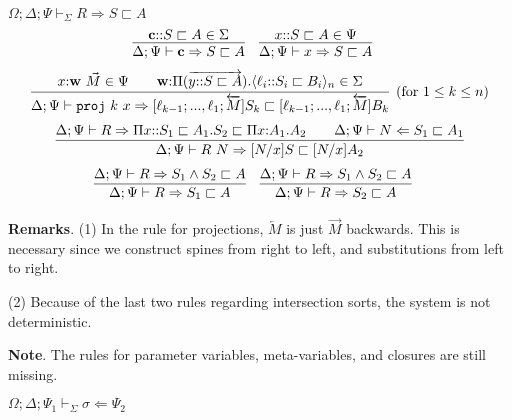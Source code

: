 \documentclass[letterpaper, 11pt]{article}
\newcommand{\Rar}{\Rightarrow}
\newcommand{\Lar}{\Leftarrow}
\newcommand{\proj}{\texttt{proj}}
\begin{document}
    $\boxed{\Omega; \Delta; \Psi \vdash_\Sigma R \Rar S \sqsubset A}$
    \begin{align*}
      & \infer{\Delta; \Psi \vdash \textbf{c} \Rar S \sqsubset A}
        {
          \textbf{c} {::} S \sqsubset A \in \Sigma
        } &
      & \infer{\Delta; \Psi \vdash x \Rar S \sqsubset A}
        {
          x {::} S \sqsubset A \in \Psi
        } 
    \end{align*}
    \begin{align*}
      \infer[(\text{for } 1 \leq k \leq n)]
            {\Delta; \Psi \vdash \proj \ k \ x \Rar [\ell_{k-1}; ..., \ell_1; \overleftarrow{M}]S_k \sqsubset [\ell_{k-1}; ..., \ell_1; \overleftarrow{M}] B_k}
            {
              x {:} \textbf{w} \ \vec{M} \in \Psi
              &&
              \textbf{w} {:} \Pi (\overrightarrow{y {::} S \sqsubset A}). \langle \ell_i {::} S_i \sqsubset B_i \rangle_n \in \Sigma
            }
    \end{align*}
    \begin{align*}
      \infer{\Delta; \Psi \vdash R \ N \Rar [N/x]S \sqsubset [N/x]A_2}
            {
              \Delta; \Psi \vdash R \Rar \Pi x{::}S_1 \sqsubset A_1. S_2 \sqsubset \Pi x{:}A_1. A_2
              &&
              \Delta; \Psi \vdash N \Lar S_1 \sqsubset A_1
            }
    \end{align*}
    \begin{align*}
      & \infer{\Delta; \Psi \vdash R \Rar S_1 \sqsubset A}
              {\Delta; \Psi \vdash R \Rar S_1 \land S_2 \sqsubset A} &
      & \infer{\Delta; \Psi \vdash R \Rar S_2 \sqsubset A}
              {\Delta; \Psi \vdash R \Rar S_1 \land S_2 \sqsubset A}
    \end{align*}
    
    \textbf{Remarks}. (1) In the rule for projections, $\overleftarrow{M}$ is just $\vec{M}$ backwards.  This is necessary since we construct spines
    from right to left, and substitutions from left to right.

    (2) Because of the last two rules regarding intersection sorts, the system is not deterministic.

    \textbf{Note}.  The rules for parameter variables, meta-variables, and closures are still missing.  

    $\boxed{\Omega; \Delta; \Psi_1 \vdash_\Sigma \sigma \Lar \Psi_2}$
\end{document}
